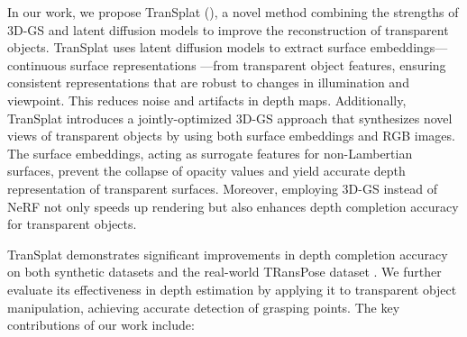 In our work, we propose TranSplat (), a novel method combining the strengths of \ac{3D-GS} \cite{kerbl20233d} and latent diffusion models to improve the reconstruction of transparent objects. TranSplat uses latent diffusion models to extract surface embeddings—continuous surface representations \cite{lee2023nfl, haugaard2022surfemb}—from transparent object features, ensuring consistent representations that are robust to changes in illumination and viewpoint. This reduces noise and artifacts in depth maps. Additionally, TranSplat introduces a jointly-optimized \ac{3D-GS} approach that synthesizes novel views of transparent objects by using both surface embeddings and RGB images. The surface embeddings, acting as surrogate features for non-Lambertian surfaces, prevent the collapse of opacity values and yield accurate depth representation of transparent surfaces. Moreover, employing \ac{3D-GS} instead of NeRF not only speeds up rendering but also enhances depth completion accuracy for transparent objects.

TranSplat demonstrates significant improvements in depth completion accuracy on both synthetic datasets and the real-world TRansPose dataset \cite{kim2024transpose}. We further evaluate its effectiveness in depth estimation by applying it to transparent object manipulation, achieving accurate detection of grasping points. The key contributions of our work include:

